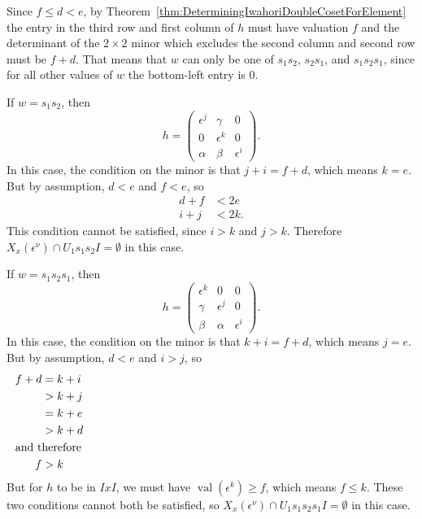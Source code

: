 \documentclass{amsart}
\theoremstyle{definition}
\def\e{\epsilon}
\def\val{\mathop{\mathrm{val}}}
\def\en{\e^{\nu}}
\def\X{X_x(\en)}
\begin{document}
  Since $f \le d < e$, by
  Theorem~\ref{thm:DeterminingIwahoriDoubleCosetForElement} the entry in the
  third row and first column of $h$ must have valuation $f$ and the determinant
  of the $2 \times 2$ minor which excludes the second column and second row
  must be $f + d$.  That means that $w$ can only be one of $s_1s_2$, $s_2s_1$,
  and $s_1s_2s_1$, since for all other values of $w$ the bottom-left entry is
  0.

  If $w = s_1s_2$, then
  \begin{equation*}
    h = \begin{pmatrix}
      \e^j & \gamma & 0 \\
      0 & \e^k & 0 \\
      \alpha & \beta & \e^i
    \end{pmatrix}.
  \end{equation*}
  In this case, the condition on the minor is that $j + i = f + d$, which means
  $k = e$.  But by assumption, $d < e$ and $f < e$, so
  \begin{align*}
    d + f &< 2e \\
    i + j &< 2k.
  \end{align*}
  This condition cannot be satisfied, since $i > k$ and $j > k$.  Therefore $\X
  \cap U_1 s_1 s_2 I = \emptyset$ in this case.

  If $w = s_1s_2s_1$, then
  \begin{equation*}
    h = \begin{pmatrix}
      \e^k & 0 & 0 \\
      \gamma & \e^j & 0 \\
      \beta & \alpha & \e^i
    \end{pmatrix}.
  \end{equation*}
  In this case, the condition on the minor is that $k + i = f + d$, which means
  $j = e$.  But by assumption, $d < e$ and $i > j$, so
  \begin{align*}
    f + d &= k + i \\
          &> k + j \\
          &= k + e \\
          &> k + d \\
    \noalign{\noindent and therefore}
        f &> k
  \end{align*}
  But for $h$ to be in $IxI$, we must have $\val(\e^k) \ge f$, which means $f
  \le k$.  These two conditions cannot both be satisfied, so $\X
  \cap U_1 s_1 s_2 s_1 I = \emptyset$ in this case.
\end{document}
